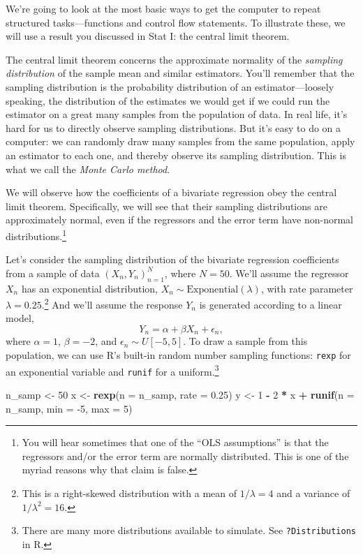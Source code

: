 \documentclass[12pt,oneside,openany]{book}
\newenvironment{Shaded}{\begin{snugshade}}{\end{snugshade}}
\newcommand{\KeywordTok}[1]{\textcolor[rgb]{0.13,0.29,0.53}{\textbf{#1}}}
\newcommand{\DataTypeTok}[1]{\textcolor[rgb]{0.13,0.29,0.53}{#1}}
\newcommand{\DecValTok}[1]{\textcolor[rgb]{0.00,0.00,0.81}{#1}}
\newcommand{\FloatTok}[1]{\textcolor[rgb]{0.00,0.00,0.81}{#1}}
\newcommand{\StringTok}[1]{\textcolor[rgb]{0.31,0.60,0.02}{#1}}
\newcommand{\OperatorTok}[1]{\textcolor[rgb]{0.81,0.36,0.00}{\textbf{#1}}}
\newcommand{\NormalTok}[1]{#1}
\begin{document}
We're going to look at the most basic ways to get the computer to repeat
structured tasks---functions and control flow statements. To illustrate
these, we will use a result you discussed in Stat I: the central limit
theorem.

The central limit theorem concerns the approximate normality of the
\emph{sampling distribution} of the sample mean and similar estimators.
You'll remember that the sampling distribution is the probability
distribution of an estimator---loosely speaking, the distribution of the
estimates we would get if we could run the estimator on a great many
samples from the population of data. In real life, it's hard for us to
directly observe sampling distributions. But it's easy to do on a
computer: we can randomly draw many samples from the same population,
apply an estimator to each one, and thereby observe its sampling
distribution. This is what we call the \emph{Monte Carlo method}.

We will observe how the coefficients of a bivariate regression obey the
central limit theorem. Specifically, we will see that their sampling
distributions are approximately normal, even if the regressors and the
error term have non-normal distributions.\footnote{You will hear
  sometimes that one of the ``OLS assumptions'' is that the regressors
  and/or the error term are normally distributed. This is one of the
  myriad reasons why that claim is false.}

Let's consider the sampling distribution of the bivariate regression
coefficients from a sample of data \((X_n, Y_n)_{n=1}^N\), where
\(N = 50\). We'll assume the regressor \(X_n\) has an exponential
distribution, \(X_n \sim \text{Exponential}(\lambda)\), with rate
parameter \(\lambda = 0.25\).\footnote{This is a right-skewed
  distribution with a mean of \(1 / \lambda = 4\) and a variance of
  \(1 / \lambda^2 = 16\).} And we'll assume the response \(Y_n\) is
generated according to a linear model,
\[Y_n = \alpha + \beta X_n + \epsilon_n,\] where \(\alpha = 1\),
\(\beta = -2\), and \(\epsilon_n \sim U[-5, 5]\). To draw a sample from
this population, we can use R's built-in random number sampling
functions: \texttt{rexp} for an exponential variable and \texttt{runif}
for a uniform.\footnote{There are many more distributions available to
  simulate. See \texttt{?Distributions} in R.}

\begin{Shaded}
\begin{Highlighting}[]
\NormalTok{n_samp <-}\StringTok{ }\DecValTok{50}
\NormalTok{x <-}\StringTok{ }\KeywordTok{rexp}\NormalTok{(}\DataTypeTok{n =}\NormalTok{ n_samp, }\DataTypeTok{rate =} \FloatTok{0.25}\NormalTok{)}
\NormalTok{y <-}\StringTok{ }\DecValTok{1} \OperatorTok{-}\StringTok{ }\DecValTok{2} \OperatorTok{*}\StringTok{ }\NormalTok{x }\OperatorTok{+}\StringTok{ }\KeywordTok{runif}\NormalTok{(}\DataTypeTok{n =}\NormalTok{ n_samp, }\DataTypeTok{min =} \DecValTok{-5}\NormalTok{, }\DataTypeTok{max =} \DecValTok{5}\NormalTok{)}
\end{Highlighting}
\end{Shaded}
\end{document}

